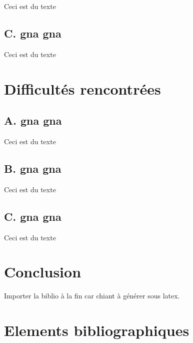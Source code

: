 \documentclass[12pt]{article}
\begin{document}
		Ceci est du texte
		
		\subsection{ C. gna gna}
		
		Ceci est du texte
		
		\clearpage
		
	\section{Difficultés rencontrées}    

		\subsection{ A. gna gna}
		
		Ceci est du texte
		
		\subsection{ B. gna gna}
		
		Ceci est du texte
		
		\subsection{ C. gna gna}
		
		Ceci est du texte
		
		\clearpage

	\section{Conclusion}
	
		Importer la biblio à la fin car chiant à générer sous latex.
		
		\clearpage

	\section{Elements bibliographiques}
	
\end{document}
